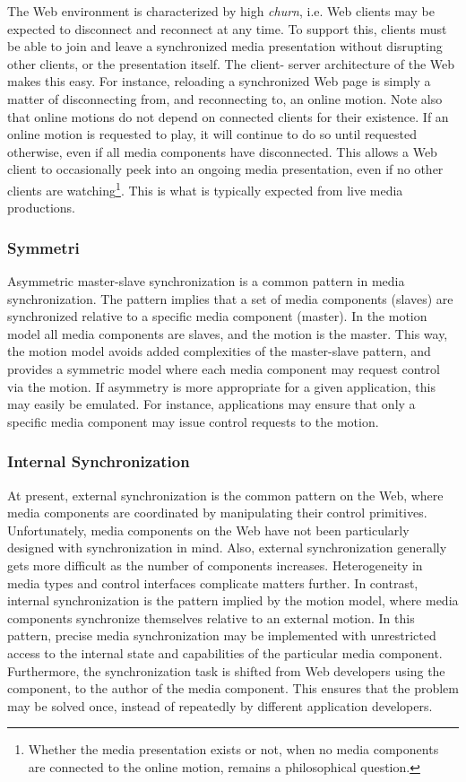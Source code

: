 The Web environment is characterized by high \emph{churn}, i.e. Web clients
may be expected to disconnect and reconnect at any time. To support this,
clients must be able to join and leave a synchronized media presentation
without disrupting other clients, or the presentation itself. The client-
server architecture of the Web makes this easy. For instance, reloading a
synchronized Web page is simply a matter of disconnecting from, and
reconnecting to, an online motion. Note also that online motions do not depend
on connected clients for their existence. If an online motion is requested to
play, it will continue to do so until requested otherwise, even if all media
components have disconnected. This allows a Web client to occasionally peek
into an ongoing media presentation, even if no other clients are
watching\footnote{Whether the media presentation exists or not, when no media
components are connected to the online motion, remains a philosophical
question.}. This is what is typically expected from live media productions.


\subsubsection{Symmetri}

Asymmetric master-slave synchronization is a common pattern in media
synchronization. The pattern implies that a set of media components (slaves)
are synchronized relative to a specific media component (master). In the
motion model all media components are slaves, and the motion is the master.
This way, the motion model avoids added complexities of the master-slave
pattern, and provides a symmetric model where each media component may request
control via the motion. If asymmetry is more appropriate for a given
application, this may easily be emulated. For instance, applications may
ensure that only a specific media component may issue control requests to the
motion.

\subsubsection{Internal Synchronization}

At present, external synchronization is the common pattern on the Web, where
media components are coordinated by manipulating their control primitives.
Unfortunately, media components on the Web have not been particularly designed
with synchronization in mind. Also, external synchronization generally gets
more difficult as the number of components increases. Heterogeneity in media
types and control interfaces complicate matters further. In contrast, internal
synchronization is the pattern implied by the motion model, where media
components synchronize themselves relative to an external motion. In this
pattern, precise media synchronization may be implemented with unrestricted
access to the internal state and capabilities of the particular media
component. Furthermore, the synchronization task is shifted from Web
developers using the component, to the author of the media component. This
ensures that the problem may be solved once, instead of repeatedly by
different application developers.


